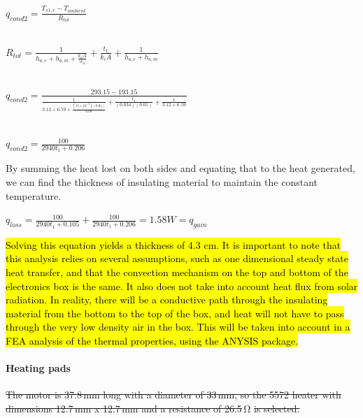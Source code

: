 \begin{center}
 $q_{cond2} = \frac{T_{s1,e}-T_{ambient}}{R_{tot}} $\\
 
 \ 
 
 $R_{tot} = \frac{1}{h_{a,e}+h_{a,m}+\frac{k_{a}A}{w_{a}}} + \frac{t_{1}}{k_{i}A} + \frac{1}{h_{a,e}+h_{a,m}}  $\\
 
 \
 \ 
 
 $q_{cond2} = \frac{293.15 - 193.15}{\frac{1}{3.12+6.59+\frac{(15\times10^{-3})(0.01)}{0.08}} + \frac{t_{1}}{(0.034)(0.01)} + \frac{1}{3.12+6.59}} $\\
 
 \  
 \ 
 
 $q_{cond2} = \frac{100}{2940t_{1}+0.206} $\\
 
\end{center}

By summing the heat lost on both sides and equating that to the heat generated, we can find the thickness of insulating material to maintain the constant temperature. \\

\begin{center}
 $q_{loss} = \frac{100}{2940t_{1}+0.105} + \frac{100}{2940t_{1}+0.206} = 1.58 W = q_{gain} $\\
\end{center}

\hl{Solving this equation yields a thickness of 4.3 cm. It is important to note that this analysis relies on several assumptions, such as one dimensional steady state heat transfer, and that the convection mechanism on the top and bottom of the electronics box is the same. It also does not take into account heat flux from solar radiation. In reality, there will be a conductive path through the insulating material from the bottom to the top of the box, and heat will not have to pass through the very low density air in the box. This will be taken into account in a FEA analysis of the thermal properties, using the ANYSIS package.} \\

\paragraph{Heating pads}

\st{The motor is 37.8\,mm long with a diameter of 33\,mm, so the 5572 heater with dimensions 12.7\,mm x 12.7\,mm and a resistance of 26.5}\,\si{\ohm} \st{is selected.}\\

